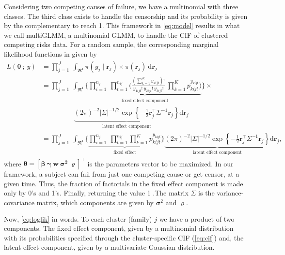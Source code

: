 Considering two competing causes of failure, we have a multinomial with
three classes. The third class exists to handle the censorship and its
probability is given by the complementary to reach 1. This framework in
\autoref{eq:model} results in what we call multiGLMM, a multinomial
GLMM, to handle the CIF of clustered competing risks data. For a random
sample, the corresponding marginal likelihood functions in given by
\begin{align}
  L(\bm{\theta}~;~y)
  &= \prod_{j=1}^{J}~\int_{\Re^{4}}
    \pi(y_{j} \mid \bm{r}_{j})\times\pi(\bm{r}_{j})~\text{d}\bm{r}_{j}
    \nonumber\\
  &= \prod_{j=1}^{J}~\int_{\Re^{4}}
    \Bigg\{
    \underbrace{\prod_{i=1}^{n_{j}}~\prod_{t=1}^{n_{ij}}
    \Bigg(
    \frac{(\sum_{k=1}^{K}y_{kijt})!}{y_{1ijt}!~y_{2ijt}!~y_{3ijt}!}~
    \prod_{k=1}^{K} p_{kijt}^{y_{kijt}}
    \Bigg)}_{\substack{\text{fixed effect component}}}
  \Bigg\}\times\nonumber\\
  &\hspace{2cm}\underbrace{
    (2\pi)^{-2} |\Sigma|^{-1/2} \exp
    \left\{-\frac{1}{2}\bm{r}_{j}^{\top} \Sigma^{-1} \bm{r}_{j}\right\}
    }_{\substack{\text{latent effect component}}}
    \text{d}\bm{r}_{j}\nonumber\\
  &= \prod_{j=1}^{J}~\int_{\Re^{4}}
    \Bigg\{
    \underbrace{\prod_{i=1}^{n_{j}}~\prod_{t=1}^{n_{ij}}
    \prod_{k=1}^{K} p_{kijt}^{y_{kijt}}
    }_{\substack{\text{fixed effect}}}
  \Bigg\}\underbrace{
  (2\pi)^{-2} |\Sigma|^{-1/2} \exp
  \left\{-\frac{1}{2}\bm{r}_{j}^{\top} \Sigma^{-1} \bm{r}_{j}\right\}
  }_{\substack{\text{latent effect component}}}
  \text{d}\bm{r}_{j}\label{eq:loglik},
\end{align}
where \(\bm{\theta} = [\bm{\beta}~\bm{\gamma}~\bm{w}~\bm{\sigma^{2}}~
\bm{\varrho}]^{\top}\) is the parameters vector to be maximized. In our
framework, a subject can fail from just one competing cause or get
censor, at a given time. Thus, the fraction of factorials in the fixed
effect component is made only by 0's and 1's. Finally, returning the
value 1 .The matrix \(\Sigma\) is the variance-covariance matrix, which
components are given by \(\bm{\sigma}^{2}\) and \(\bm{\varrho}\).

Now, \autoref{eq:loglik} in words. To each cluster (family) \(j\) we
have a product of two components. The fixed effect component, given by a
multinomial distribution with its probabilities specified through the
cluster-specific CIF (\autoref{eq:cif}) and, the latent effect
component, given by a multivariate Gaussian distribution.

